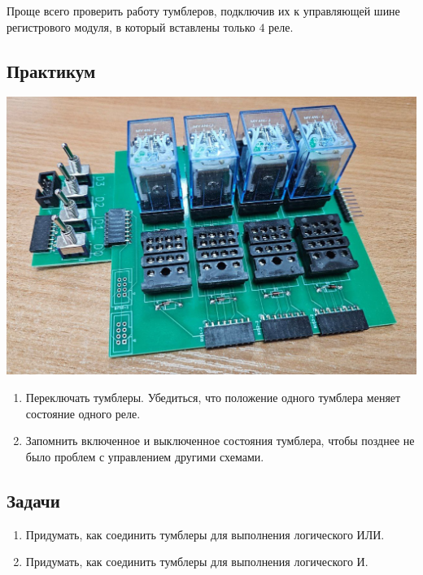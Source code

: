 Проще всего проверить работу тумблеров, подключив их к управляющей шине
регистрового модуля, в который вставлены только $4$ реле.

\subsection{Практикум}

\includegraphics[width=0.5\columnwidth]{photo/switches.jpg}

\begin{enumerate}
    \item Переключать тумблеры. Убедиться, что положение одного тумблера меняет состояние одного реле.
    \item Запомнить включенное и выключенное состояния тумблера, чтобы позднее не было проблем с управлением другими схемами.
\end{enumerate}

\subsection{Задачи}

\begin{enumerate}
    \item Придумать, как соединить тумблеры для выполнения логического ИЛИ.
    \item Придумать, как соединить тумблеры для выполнения логического И.
\end{enumerate}
